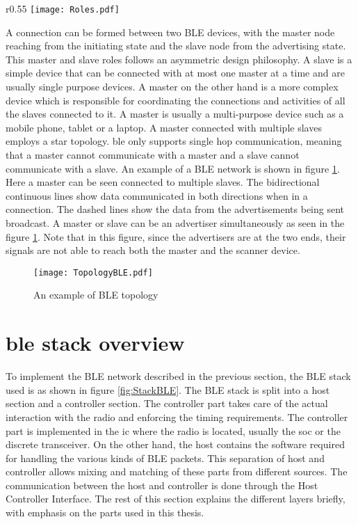 \begin{wrapfigure}{r}{0.55\textwidth}
\centering
\texttt{[image: Roles.pdf]}
\caption{State diagram of BLE states \cite{BLE101}}
\label{fig:Roles}
\vspace{-10pt}
\end{wrapfigure}

A connection can be formed between two BLE devices, with the master node reaching from the initiating state and the slave node from the advertising state. This master and slave roles follows an asymmetric design philosophy. A slave is a simple device that can be connected with at most one master at a time and are usually single purpose devices. A master on the other hand is a more complex device which is responsible for coordinating the connections and activities of all the slaves connected to it. A master is usually a multi-purpose device such as a mobile phone, tablet or a laptop. A master connected with multiple slaves employs a star topology. \gls{ble} only supports single hop communication, meaning that a master cannot communicate with a master and a slave cannot communicate with a slave. An example of a BLE network is shown in figure \ref{fig:TopoBLE}. Here a master can be seen connected to multiple slaves. The bidirectional continuous lines show data communicated in both directions when in a connection. The dashed lines show the data from the advertisements being sent broadcast. A master or slave can be an advertiser simultaneously as seen in the figure \ref{fig:TopoBLE}. Note that in this figure, since the advertisers are at the two ends, their signals are not able to reach both the master and the scanner device.

\begin{figure}[h]
\centering
\texttt{[image: TopologyBLE.pdf]}
\caption{An example of BLE topology \cite{BLE101}}
\label{fig:TopoBLE}
\vspace{-10pt}
\end{figure}

\section[\texorpdfstring{\gls{ble}}{BLE} Stack Overview]{\texorpdfstring{\gls{ble}}{BLE} stack overview\cite{Heydon2012}}

To implement the BLE network described in the previous section, the BLE stack used is as shown in figure \ref{fig:StackBLE}. The BLE stack is split into a host section and a controller section. The controller part takes care of the actual interaction with the radio and enforcing the timing requirements. The controller part is implemented in the \gls{ic} where the radio is located, usually the \gls{soc} or the discrete transceiver. On the other hand, the host contains the software required for handling the various kinds of BLE packets. This separation of host and controller allows mixing and matching of these parts from different sources. The communication between the host and controller is done through the Host Controller Interface. The rest of this section explains the different layers briefly, with emphasis on the parts used in this thesis.

